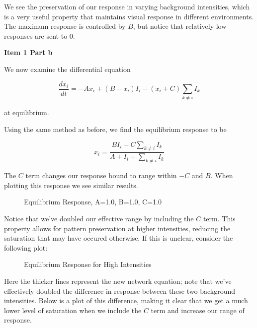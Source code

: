 \documentclass[a4paper,12pt]{article}
\begin{document}
We see the preservation of our response in varying background intensities, which is a very useful property that maintains visual response in different environments. The maximum response is controlled by $B$, but notice that relatively low responses are sent to 0. 

\bigskip
{\bf Item 1 Part b}
\bigskip

We now examine the differential equation

\begin{equation}
\frac{dx_i}{dt} = -Ax_i+(B-x_i)I_i-(x_i+C) \sum_{k \neq i}I_k
\end{equation}

at equilibrium. 

\vfil\eject

Using the same method as before, we find the equilibrium response to be

\begin{equation}
x_i =  \frac{BI_i-C\sum_{k\neq i}I_k}{A+I_i+\sum_{k\neq i}I_k}
\end{equation}

The $C$ term changes our response bound to range within $-C$ and $B$. When plotting this response we see similar results. 

\begin{center}
  \begin{figure}[h!]
    \caption{\label{pict1}Equilibrium Response, A=1.0, B=1.0, C=1.0}
  \end{figure}
\end{center}

Notice that we've doubled our effective range by including the $C$ term. This property allows for pattern preservation at higher intensities, reducing the saturation that may have occured otherwise. If this is unclear, consider the following plot:

\begin{center}
  \begin{figure}[h!]
    \caption{\label{pict1}Equilibrium Response for High Intensities}
  \end{figure}
\end{center}

Here the thicker lines represent the new network equation; note that we've effectively doubled the difference in response between these two background intensities. Below is a plot of this difference, making it clear that we get a much lower level of saturation when we include the $C$ term and increase our range of response. 
\end{document}
